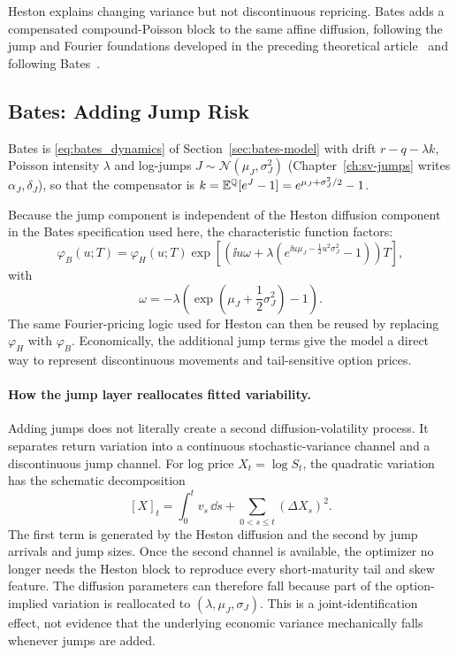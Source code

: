 Heston explains changing variance but not discontinuous repricing. Bates adds a compensated compound-Poisson block to the same affine diffusion, following the jump and Fourier foundations developed in the preceding theoretical article~\cite{team6} and following Bates~\cite{Bates1996}.

\vspace{0.5cm}
\subsection{Bates: Adding Jump Risk}

Bates is \eqref{eq:bates_dynamics} of Section~\ref{sec:bates-model} with drift \(r-q-\lambda k\), Poisson intensity \(\lambda\) and log-jumps \(J\sim\mathcal{N}(\mu_J,\sigma_J^2)\) (Chapter~\ref{ch:sv-jumps} writes \(\alpha_J,\delta_J\)), so that the compensator is \(k=\mathbb{E}^{\mathbb{Q}}[e^J-1]=e^{\mu_J+\sigma_J^2/2}-1\).

Because the jump component is independent of the Heston diffusion component in the Bates specification used here, the characteristic function factors:
\begin{equation}
    \varphi_B(u;T)
    =
    \varphi_H(u;T)
    \exp\left[
        \left(
        \ii u\omega
        +
        \lambda
        \left(
            e^{\ii u\mu_J-\frac{1}{2}u^2\sigma_J^2}-1
        \right)
        \right)T
    \right],
\end{equation}
with
\[
    \omega=-\lambda\left(\exp\left(\mu_J+\frac{1}{2}\sigma_J^2\right)-1\right).
\]
The same Fourier-pricing logic used for Heston can then be reused by replacing \(\varphi_H\) with \(\varphi_B\). Economically, the additional jump terms give the model a direct way to represent discontinuous movements and tail-sensitive option prices.

\paragraph{How the jump layer reallocates fitted variability.}
Adding jumps does not literally create a second diffusion-volatility process. It separates return variation into a continuous stochastic-variance channel and a discontinuous jump channel. For log price \(X_t=\log S_t\), the quadratic variation has the schematic decomposition
\begin{equation}\label{eq:quadratic-variation-split}
    [X]_t
    =
    \int_0^t v_s\,\dd s
    +
    \sum_{0<s\leq t}(\Delta X_s)^2.
\end{equation}
The first term is generated by the Heston diffusion and the second by jump arrivals and jump sizes. Once the second channel is available, the optimizer no longer needs the Heston block to reproduce every short-maturity tail and skew feature. The diffusion parameters can therefore fall because part of the option-implied variation is reallocated to \((\lambda,\mu_J,\sigma_J)\). This is a joint-identification effect, not evidence that the underlying economic variance mechanically falls whenever jumps are added.

